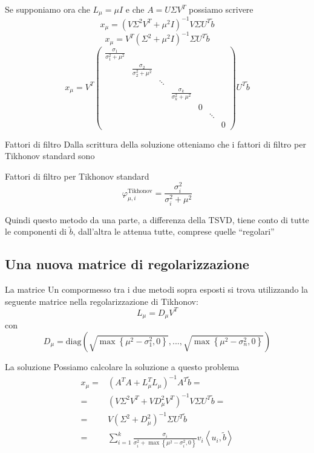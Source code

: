 \documentclass{beamer}
\theoremstyle{plain}
\theoremstyle{definition}
\theoremstyle{remark}
\newcommand{\set}[1]{\left\{#1\right\}}
\newcommand{\pa}[1]{\left(#1\right)}
\newcommand{\ang}[1]{\left<#1\right>}
\begin{document}
\begin{frame}
  Se supponiamo ora che $L_\mu = \mu I$ e che $A = U\Sigma V^T$
  possiamo scrivere
  \[  x_\mu = \pa{ V \Sigma ^2 V^T + \mu ^2 I }^{-1} V \Sigma U^T \tilde b  \]
  \[  x_\mu = V^T \pa{\Sigma ^2 + \mu ^2 I }^{-1} \Sigma U^T \tilde b \]
  \[  x_\mu = V^T
  \begin{pmatrix}
    \frac{\sigma _1 }{\sigma _1 ^2 + \mu ^2} \\
    & \frac{\sigma _2 }{\sigma _2 ^2 + \mu ^2} \\
    & & \ddots \\
    & & & \frac{\sigma _k }{\sigma _k ^2 + \mu ^2}\\
    & & & & 0\\
    & & & & & \ddots \\
    & & & & & & 0
  \end{pmatrix}
  U^T \tilde  b \]
\end{frame}

\begin{frame}{Fattori di filtro}
  Dalla scrittura della soluzione otteniamo che i fattori di filtro
  per Tikhonov standard sono
  \begin{block}{Fattori di filtro per Tikhonov standard}
  \[ \varphi ^{\text{Tikhonov}} _{\mu,i} = \frac{\sigma _i ^2}{\sigma _i
    ^2 + \mu ^2} \]
  \end{block}
  \vfill
  
  Quindi questo metodo da una parte, a differenza della TSVD, tiene
  conto di tutte le componenti di $\tilde b$, dall'altra le attenua
  tutte, comprese quelle ``regolari''
\end{frame}


\subsection{Una nuova matrice di regolarizzazione}

\begin{frame}{La matrice}
  Un compormesso tra i due metodi sopra esposti si trova utilizzando
  la seguente matrice nella regolarizzazione di Tikhonov:
  \[ L_\mu = D _\mu V^T \]
  con
  \[ D_\mu = \mathrm{diag}\pa{ \sqrt{\max\set{\mu ^2 - \sigma _1
        ^2,0}} , ..., \sqrt{\max\set{\mu ^2 - \sigma _n ^2,0}} } \]
\end{frame}

\begin{frame}{La soluzione}
  Possiamo calcolare la soluzione a questo problema
  \begin{align*}
    x_\mu =& \pa{ A^T A + L_\mu^T L_\mu }^{-1} A^T \tilde b = \\
    = & \pa{ V \Sigma ^2 V^T + V D_\mu ^2 V^T} ^{-1} V\Sigma U^T \tilde
    b = \\
    = & V \pa{ \Sigma ^2 + D_\mu ^2 } ^{-1} \Sigma U^T \tilde b \\
    = & \sum _{i=1} ^k \frac{\sigma _i}{\sigma _i ^2 + \max\set{
      \mu ^2 - \sigma _i ^2 ,0}  }  v_i \ang{u_i,\tilde b}
  \end{align*}
\end{frame}
\end{document}
